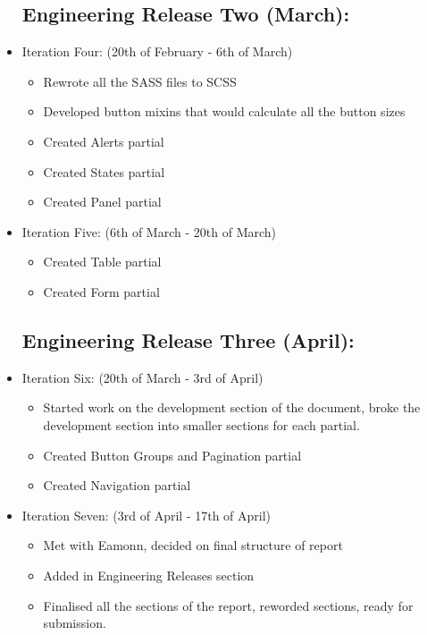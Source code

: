 \begin{itemize}
	\subsection*{Engineering Release Two (March):}
	\item Iteration Four: (20th of February - 6th of March)\begin{itemize} 
	\item Rewrote all the \gls{SASS} files to \gls{SCSS}
	\item Developed button mixins that would calculate all the button sizes
	\item Created Alerts partial
	\item Created States partial
	\item Created Panel partial
	\end{itemize}
	\item Iteration Five: (6th of March - 20th of March) \begin{itemize}
	\item Created Table partial
	\item Created Form partial
	\end{itemize}
	\subsection*{Engineering Release Three (April):}
	\item Iteration Six: (20th of March - 3rd of April)\begin{itemize}
	\item Started work on the development section of the document, broke the development section into smaller sections for each partial. 
	\item Created Button Groups and Pagination partial
	\item Created Navigation partial
	\end{itemize}
		\item Iteration Seven: (3rd of April - 17th of April)\begin{itemize}
	\item Met with Eamonn, decided on final structure of report
	\item Added in Engineering Releases section
	\item Finalised all the sections of the report, reworded sections, ready for submission.
	\end{itemize}	
\end{itemize}

